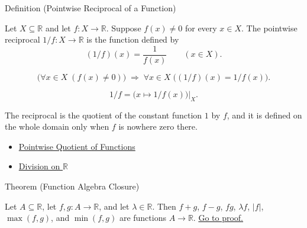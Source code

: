 \begin{definitionbox}{Definition (Pointwise Reciprocal of a Function)}
\begin{definition}
\label{def:pointwise-reciprocal-of-a-function}
Let \(X\subseteq\mathbb{R}\) and let \(f:X\to\mathbb{R}\).  Suppose
\(f(x)\neq0\) for every \(x\in X\).  The pointwise reciprocal
\(1/f:X\to\mathbb{R}\) is the function defined by
\[
  (1/f)(x)=\frac{1}{f(x)}
  \qquad (x\in X).
\]
\end{definition}
\end{definitionbox}

\begin{remark*}
\[
  \bigl(\forall x\in X\;(f(x)\neq0)\bigr)
  \;\Longrightarrow\;
  \forall x\in X\;\bigl((1/f)(x)=1/f(x)\bigr).
\]
\end{remark*}

\begin{remark*}
\[
  1/f
  =
  \bigl(x\mapsto 1/f(x)\bigr)\big|_{X}.
\]
\end{remark*}

\begin{remark*}[Interpretation]
The reciprocal is the quotient of the constant function \(1\) by \(f\), and it
is defined on the whole domain only when \(f\) is nowhere zero there.
\end{remark*}

\begin{dependencies}
\begin{itemize}
  \item \hyperref[def:pointwise-quotient-of-functions]{Pointwise Quotient of Functions}
  \item \hyperref[def:division-on-r]{Division on \(\mathbb{R}\)}
\end{itemize}
\end{dependencies}

\begin{theorembox}{Theorem (Function Algebra Closure)}
\begin{theorem}
\label{thm:function-algebra-closure}
Let \(A\subseteq\mathbb{R}\), let \(f,g:A\to\mathbb{R}\), and let
\(\lambda\in\mathbb{R}\).  Then \(f+g\), \(f-g\), \(fg\), \(\lambda f\),
\(|f|\), \(\max(f,g)\), and \(\min(f,g)\) are functions \(A\to\mathbb{R}\).
\hyperref[prf:function-algebra-closure]{Go to proof.}
\end{theorem}
\end{theorembox}

